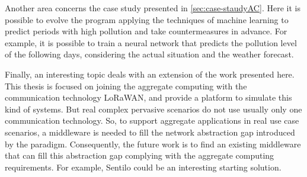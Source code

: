 Another area concerns the case study presented in \cref{sec:case-staudyAC}. 
Here it is possible to evolve the program applying the techniques of machine learning to predict periods with high pollution and take countermeasures in advance. 
For example, it is possible to train a neural network that predicts the pollution level of the following days, considering the actual situation and the weather forecast.

Finally, an interesting topic deals with an extension of the work presented here.
This thesis is focused on joining the aggregate computing with the communication technology LoRaWAN, and provide a platform to simulate this kind of systems.
But real complex pervasive scenarios do not use usually only one communication technology.
So, to support aggregate applications in real use case scenarios, a middleware is needed to fill the network abstraction gap introduced by the paradigm.
Consequently, the future work is to find an existing middleware that can fill this abstraction gap complying with the aggregate computing requirements. For example, Sentilo could be an interesting starting solution.